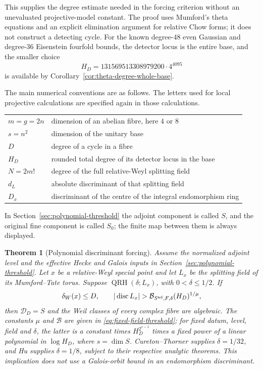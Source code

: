 \documentclass[11pt]{article}
\newtheorem{theorem}{Theorem}[section]
\theoremstyle{definition}
\theoremstyle{remark}
\begin{document}
This supplies the degree estimate needed in the forcing criterion
without an unevaluated projective-model constant.  The proof uses
Mumford's theta equations and an explicit elimination argument for
relative Chow forms; it does not construct a detecting cycle.
For the known degree-$48$ even Gaussian and degree-$36$ Eisenstein
fourfold bounds, the detector locus is the entire base, and the
smaller choice
\[
 H_D=131569513308979200\cdot4^{4095}
\]
is available by Corollary~\ref{cor:theta-degree-whole-base}.

The main numerical conventions are as follows.  The letters used
for local projective calculations are specified again in those
calculations.
\begin{center}
\begin{tabular}{ll}
$m=g=2n$ & dimension of an abelian fibre, here $4$ or $8$\\
$s=n^2$ & dimension of the unitary base\\
$D$ & degree of a cycle in a fibre\\
$H_D$ & rounded total degree of its detector locus in the base\\
$N=2m!$ & degree of the full relative-Weyl splitting field\\
$d_L$ & absolute discriminant of that splitting field\\
$D_x$ & discriminant of the centre of the integral endomorphism ring
\end{tabular}
\end{center}
In Section~\ref{sec:polynomial-threshold} the adjoint component is
called $S$, and the original fine component is called $S_0$;
the finite map between them is always displayed.


\begin{theorem}[Polynomial discriminant forcing]\label{thm:forcing}
Assume the normalized adjoint level and the effective Hecke and Galois
inputs in Section~\ref{sec:polynomial-threshold}.  Let $x$ be a
relative-Weyl special point and let $L_x$ be the splitting field of
its Mumford--Tate torus.  Suppose $\operatorname{QRH}(\delta;L_x)$,
with $0<\delta\leq1/2$.  If
\begin{equation}\label{eq:forcing}
 \delta_W(x)\leq D,\qquad
 |\operatorname{disc}L_x|>
 \mathcal B_{S^{\rm ad},F,\delta}(H_D)^{1/\mu},
\end{equation}
then $\mathcal D_D=S$ and the Weil classes of every complex fibre
are algebraic.  The constants $\mu$ and $\mathcal B$ are given in
\eqref{eq:fixed-field-threshold}; for fixed datum, level, field and
$\delta$, the latter is a constant times $H_D^{2^{s-1}}$ times a
fixed power of a linear polynomial in $\log H_D$, where $s=\dim S$.
Cureton--Thorner supplies $\delta=1/32$, and Hu supplies $\delta=1/8$,
subject to their respective analytic theorems.  This implication
does not use a Galois-orbit bound in an endomorphism discriminant.
\end{theorem}
\end{document}
